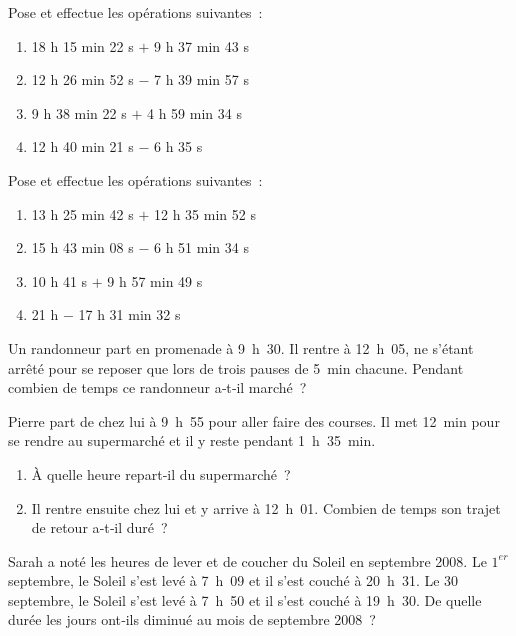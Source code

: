 


\begin{exercice}
Pose et effectue les opérations suivantes :
\begin{enumerate} 
 \item 18 h 15 min 22 s $+$ 9 h 37 min 43 s
 \item 12 h 26 min 52 s $-$ 7 h 39 min 57 s
 \item 9 h 38 min 22 s $+$ 4 h 59 min 34 s
 \item 12 h 40 min 21 s $-$ 6 h 35 s
 \end{enumerate}
\end{exercice}


\begin{exercice}
Pose et effectue les opérations suivantes :
\begin{enumerate} 
 \item 13 h 25 min 42 s $+$ 12 h 35 min 52 s
 \item 15 h 43 min 08 s $-$ 6 h 51 min 34 s
 \item 10 h 41 s $+$ 9 h 57 min 49 s
 \item 21 h $-$ 17 h 31 min 32 s
 \end{enumerate}
\end{exercice}


\begin{exercice}
Un randonneur part en promenade à 9 h 30. Il rentre à 12 h 05, ne s'étant arrêté pour se reposer que lors de trois pauses de 5 min chacune. Pendant combien de temps ce randonneur a‑t‑il marché ?
\end{exercice}


\begin{exercice}
Pierre part de chez lui à 9 h 55 pour aller faire des courses. Il met 12 min pour se rendre au supermarché et il y reste pendant 1 h 35 min.
\begin{enumerate} 
 \item À quelle heure repart‑il du supermarché ?
 \item Il rentre ensuite chez lui et y arrive à 12 h 01. Combien de temps son trajet de retour a‑t‑il duré ?
 \end{enumerate}
\end{exercice}


\begin{exercice}
Sarah a noté les heures de lever et de coucher du Soleil en septembre 2008. Le $1^{er}$ septembre, le Soleil s'est levé à 7 h 09 et il s'est couché à 20 h 31. Le 30 septembre, le Soleil s'est levé à 7 h 50 et il s'est couché à 19 h 30. De quelle durée les jours ont‑ils diminué au mois de septembre 2008 ?
\end{exercice}
 